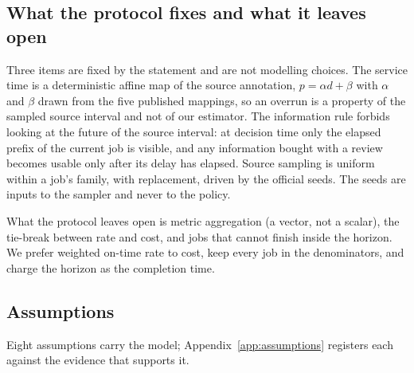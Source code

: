 \documentclass{swmcmthesis}
\begin{document}
\subsection{What the protocol fixes and what it leaves open}
\label{sec:protocol}

Three items are fixed by the statement and are not modelling choices. The service time is a deterministic affine map of the source annotation,
$p=\alpha d+\beta$ with $\alpha$ and $\beta$ drawn from the five published
mappings, so an overrun is a property of the sampled source interval and not of
our estimator. The information rule forbids looking at the future of the
source interval: at decision time only the elapsed prefix of the current job is
visible, and any information bought with a review becomes usable only after its
delay has elapsed. Source sampling is uniform within a job's family, with
replacement, driven by the official seeds. The seeds are inputs to the sampler and
never to the policy.

What the protocol leaves open is metric aggregation (a vector, not a scalar), the tie-break
between rate and cost, and jobs that cannot finish inside the horizon. We prefer weighted
on-time rate to cost, keep every job in the denominators, and charge the horizon as the
completion time.

\subsection{Assumptions}
\label{sec:assumptions}

Eight assumptions carry the model; Appendix~\ref{app:assumptions} registers each
against the evidence that supports it.
\end{document}
